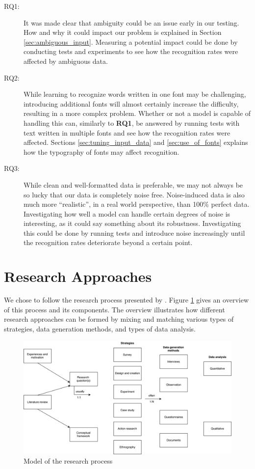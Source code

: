 \begin{description}
    \item[RQ1:]{It was made clear that ambiguity could be an issue early in our testing. How and why it could impact our problem is explained in Section \ref{sec:ambiguous_input}. Measuring a potential impact could be done by conducting tests and experiments to see how the recognition rates were affected by ambiguous data.}
    \item[RQ2:]{While learning to recognize words written in one font may be challenging, introducing additional fonts will almost certainly increase the difficulty, resulting in a more complex problem. Whether or not a model is capable of handling this can, similarly to \textbf{RQ1}, be answered by running tests with text written in multiple fonts and see how the recognition rates were affected. Sections \ref{sec:tuning_input_data} and \ref{sec:use_of_fonts} explains how the typography of fonts may affect recognition.}
    \item[RQ3:]{While clean and well-formatted data is preferable, we may not always be so lucky that our data is completely noise free. Noise-induced data is also much more ``realistic'', in a real world perspective, than 100\% perfect data. Investigating how well a model can handle certain degrees of noise is interesting, as it could say something about its robustness. Investigating this could be done by running tests and introduce noise increasingly until the recognition rates deteriorate beyond a certain point.}
\end{description}


\section{Research Approaches}
\label{sec:research_approaches}
We chose to follow the research process presented by \cite{oates2005researching}. Figure \ref{fig:model_research_process} gives an overview of this process and its components. The overview illustrates how different research approaches can be formed by mixing and matching various types of strategies, data generation methods, and types of data analysis.

\begin{figure}[ht]
    \centering
    \includegraphics[width=1\textwidth]{fig/methodology/research_strategies.png}
    \caption{Model of the research process}
    \label{fig:model_research_process}
\end{figure}


